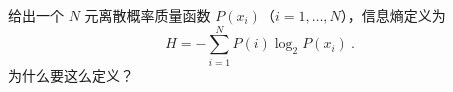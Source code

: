 
\begin{issues}
\issueDraft
\end{issues}

给出一个 $N$ 元离散概率质量函数 $P(x_i)$（$i=1,\dots,N$），信息熵定义为
\begin{equation}
H = -\sum_{i=1}^N P(i) \log_2 P(x_i)~.
\end{equation}
为什么要这么定义？
